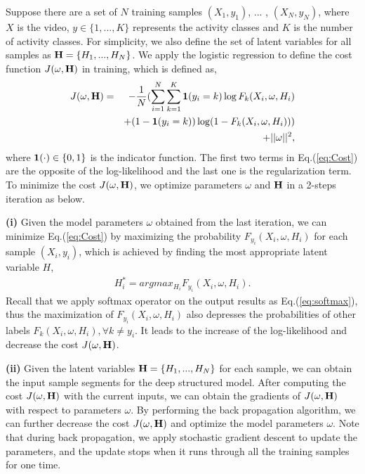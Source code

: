 \documentclass{sig-alternate}
\begin{document}
Suppose there are a set of $N$ training samples $(X_1,y_1)$, ... , $(X_N,y_N)$, where $X$ is the video, $y \in \{1,...,K\}$ represents the activity classes and $K$ is the number of activity classes. For simplicity, we also define the set of latent variables for all samples as ${\bf{H}} = \{H_1,...,H_N\}$. We apply the logistic regression to define the cost function $J(\omega,{\bf{H}})$ in training, which is defined as,
\begin{eqnarray} \label{eq:Cost}
J(\omega,{\bf{H}}) &=& - \frac{1}{N} (\sum_{i=1}^N \sum_{k=1}^K {\bf{1}}(y_i=k) \log F_k(X_i, \omega, H_i) \nonumber \\
&&+ (1 - {\bf{1}}(y_i=k)) \log(1 - F_k(X_i, \omega, H_i)) ) \nonumber \\
&& + ||\omega||^2,
\end{eqnarray}
where ${\bf{1}}(\cdot) \in \{0,1\}$ is the indicator function. The first two terms in Eq.(\ref{eq:Cost}) are the opposite of the log-likelihood and the last one is the regularization term. To minimize the cost $J(\omega,{\bf{H}})$, we optimize parameters $\omega$ and ${\bf{H}}$ in a 2-steps iteration as below.

{\textbf{(i)}} Given the model parameters $\omega$ obtained from the last iteration, we can minimize Eq.(\ref{eq:Cost}) by maximizing the probability $F_{y_i}(X_i, \omega, H_i)$ for each sample $(X_i, y_i)$, which is achieved by finding the most appropriate latent variable $H$,
\begin{eqnarray} \label{eq:EMH}
H_i^{*} = argmax_{H_i} F_{y_i}(X_i, \omega, H_i).
\end{eqnarray}
Recall that we apply softmax operator on the output results as Eq.(\ref{eq:softmax}), thus the maximization of $F_{y_i}(X_i, \omega, H_i)$ also depresses the probabilities of other labels $F_k(X_i, \omega, H_i), \forall k \neq y_i$. It leads to the increase of the log-likelihood and decrease the cost $J(\omega,{\bf{H}})$.

{\textbf{(ii)}} Given the latent variables  ${\bf{H}} = \{H_1,...,H_N\}$ for each sample, we can obtain the input sample segments for the deep structured model. After computing the cost $J(\omega,{\bf{H}})$ with the current inputs, we can obtain the gradients of $J(\omega,{\bf{H}})$ with respect to parameters $\omega$. By performing the back propagation algorithm, we can further decrease the cost $J(\omega,{\bf{H}})$ and optimize the model parameters $\omega$. Note that during back propagation, we apply stochastic gradient descent to update the parameters, and the update stops when it runs through all the training samples for one time.
\end{document}

